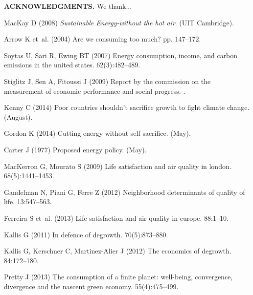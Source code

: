 \documentclass[10pt, letterpaper]{article}
\begin{document}
\begin{spacing}{1.4}
\textbf{ACKNOWLEDGMENTS.} We thank... 


\newpage
%
\begin{thebibliography}{10}

MacKay D (2008) {\em Sustainable Energy-without the hot air}.
\newblock (UIT Cambridge).

Arrow K et~al. (2004) Are we consuming too much?
 pp. 147--172.

Soytas U, Sari R, Ewing BT (2007) Energy consumption, income, and carbon
  emissions in the united states.
 62(3):482--489.

Stiglitz J, Sen A, Fitoussi J (2009) Report by the commission on the
  measurement of economic performance and social progress.
.

Kenny C (2014) Poor countries shouldn't sacrifice growth to fight climate
  change.
 (August).

Gordon K (2014) Cutting energy without self sacrifice.
 (May).

Carter J (1977) Proposed energy policy.
 (May).

MacKerron G, Mourato S (2009) Life satisfaction and air quality in london.
 68(5):1441--1453.

Gandelman N, Piani G, Ferre Z (2012) Neighborhood determinants of quality of
  life.
 13:547--563.

Ferreira S et~al. (2013) Life satisfaction and air quality in europe.
 88:1--10.

Kallis G (2011) In defence of degrowth.
 70(5):873--880.

Kallis G, Kerschner C, Martinez-Alier J (2012) The economics of degrowth.
 84:172--180.

Pretty J (2013) The consumption of a finite planet: well-being, convergence,
  divergence and the nascent green economy.
 55(4):475--499.


\end{thebibliography}
\end{spacing}
\end{document}
